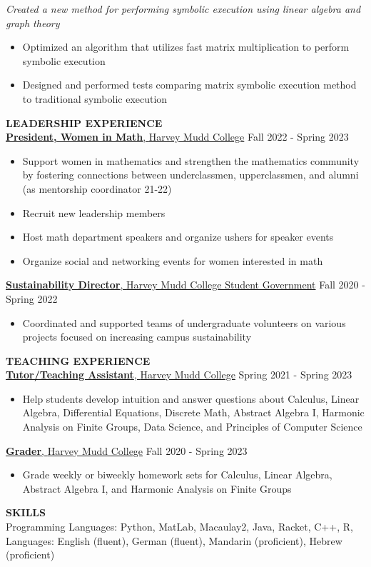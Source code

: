 \documentclass[11pt]{article}
\newcommand{\hdr}[1]{\textcolor{blue(ryb)}{\textbf{#1}}}
\newcommand{\role}[3]{\underline{\textbf{#1}, {#2}} \hfill #3}
\begin{document}
\textit{Created a new method for performing symbolic execution using linear algebra and graph theory}\\
\begin{itemize}
\item Optimized an algorithm that utilizes fast matrix multiplication to perform symbolic execution\\
\item Designed and performed tests comparing matrix symbolic execution method to traditional symbolic execution
\end{itemize}
\hdr{LEADERSHIP EXPERIENCE}\\
\role{President, Women in Math}{Harvey Mudd College}{Fall 2022 - Spring 2023}
\begin{itemize}
\item Support women in mathematics and strengthen the mathematics community by fostering connections between underclassmen, upperclassmen, and alumni (as mentorship coordinator 21-22)
\item Recruit new leadership members
\item Host math department speakers and organize ushers for speaker events
\item Organize social and networking events for women interested in math
\end{itemize}
\smallskip
\role{Sustainability Director}{Harvey Mudd College Student Government}{Fall 2020 - Spring 2022}
\begin{itemize}
\item Coordinated and supported teams of undergraduate volunteers on various projects focused on increasing campus sustainability
\end{itemize}
\medskip
\hdr{TEACHING EXPERIENCE}\\
\role{Tutor/Teaching Assistant}{Harvey Mudd College}{Spring 2021 - Spring 2023}
\begin{itemize}
\item Help students develop intuition and answer questions about Calculus, Linear Algebra, Differential Equations, Discrete Math, Abstract Algebra I, Harmonic Analysis on Finite Groups, Data Science, and Principles of Computer Science
\end{itemize}
\smallskip
\role{Grader}{Harvey Mudd College}{Fall 2020 - Spring 2023}\\
\begin{itemize}
\item Grade weekly or biweekly homework sets for Calculus, Linear Algebra, Abstract Algebra I, and Harmonic Analysis on Finite Groups   
\end{itemize}
\bigskip
\hdr{SKILLS}\\
Programming Languages: Python, MatLab, Macaulay2, Java, Racket, C++, R,\\
Languages: English (fluent), German (fluent), Mandarin (proficient), Hebrew (proficient)
\end{document}
